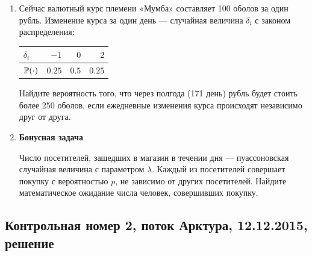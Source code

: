\documentclass[12pt, a4paper]{article}\usepackage[]{graphicx}\usepackage[]{color}
\begin{document}
\begin{enumerate}
\item Сейчас валютный курс племени «Мумба» составляет 100 оболов за один рубль. Изменение курса за один день — случайная величина $\delta_i$ с законом распределения:

\begin{center}
\begin{tabular}{lrrr}
\toprule
$\delta_i$ & $-1$ & $0$ & $2$ \\ \midrule
$\P(\cdot)$ & $0.25$ & $0.5$ & $0.25$ \\
\bottomrule
\end{tabular}
\end{center}

Найдите вероятность того, что через полгода (171 день) рубль будет стоить более 250 оболов, если ежедневные изменения курса происходят независимо друг от друга.

\item \textbf{Бонусная задача}

Число посетителей, зашедших в магазин в течении дня — пуассоновская случайная величина с параметром $\lambda$. Каждый из посетителей совершает покупку с вероятностью $p$, не зависимо от других посетителей. Найдите математическое ожидание числа человек, совершивших покупку.

\end{enumerate}


\subsection{Контрольная номер 2, поток Арктура, 12.12.2015, решение}
\end{document}
